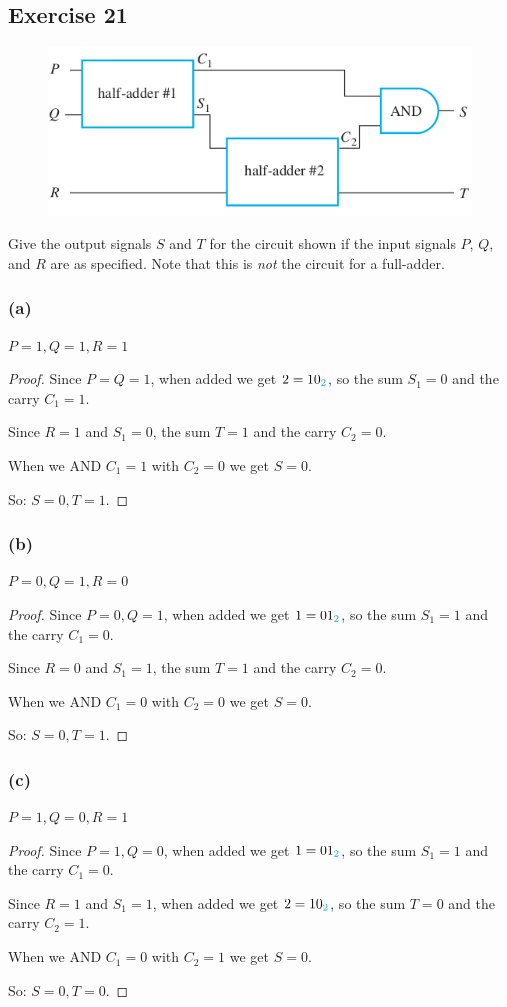 \documentclass[14pt]{extarticle}
\newcommand{\base}[1]{{\color{cyan}#1}} \newcommand{\da}{\downarrow}
\begin{document}
\subsection{Exercise 21} \begin{figure}[ht!] \centering
\includegraphics[scale=0.4]{../images/2.5.21.png} \end{figure}

Give the output signals $S$ and $T$ for the circuit shown if the input signals
$P$, $Q$, and $R$ are as specified. Note that this is {\it not} the circuit for
a full-adder.

\subsubsection{(a)} $P = 1, Q = 1, R = 1$
\begin{proof} Since $P = Q = 1$, when added we get $2 = 10_\base{2}$, so the sum
$S_1 = 0$ and the carry $C_1 = 1$.

Since $R = 1$ and $S_1 = 0$, the sum $T = 1$ and the carry $C_2 = 0$.

When we AND $C_1 = 1$ with $C_2 = 0$ we get $S = 0$.

So: $S = 0, T = 1$. \end{proof}
\subsubsection{(b)} $P = 0, Q = 1, R = 0$
\begin{proof} Since $P = 0, Q = 1$, when added we get $1 = 01_\base{2}$, so the
sum $S_1 = 1$ and the carry $C_1 = 0$.

Since $R = 0$ and $S_1 = 1$, the sum $T = 1$ and the carry $C_2 = 0$.

When we AND $C_1 = 0$ with $C_2 = 0$ we get $S = 0$.

So: $S = 0, T = 1$. \end{proof}
\subsubsection{(c)} $P = 1, Q = 0, R = 1$
\begin{proof} Since $P = 1, Q = 0$, when added we get $1 = 01_\base{2}$, so the
sum $S_1 = 1$ and the carry $C_1 = 0$.

Since $R = 1$ and $S_1 = 1$, when added we get $2 = 10_\base{2}$, so the sum $T
= 0$ and the carry $C_2 = 1$.

When we AND $C_1 = 0$ with $C_2 = 1$ we get $S = 0$.

So: $S = 0, T = 0$. \end{proof}
\end{document}
